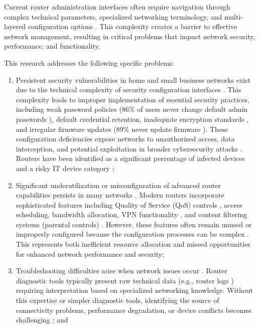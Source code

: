 Current router administration interfaces often require navigation through complex technical parameters, specialized networking terminology, and multi-layered configuration options \cite{home_network_challenges}. This complexity creates a barrier to effective network management, resulting in critical problems that impact network security, performance, and functionality.

This research addresses the following specific problems:

\begin{enumerate}
\item Persistent security vulnerabilities in home and small business networks exist due to the technical complexity of security configuration interfaces \cite{consumer_cybersecurity}. This complexity leads to improper implementation of essential security practices, including weak password policies (86\% of users never change default admin passwords \cite{router_password_study}), default credential retention, inadequate encryption standards \cite{iot_security_challenges}, and irregular firmware updates (89\% never update firmware \cite{router_password_study}). These configuration deficiencies expose networks to unauthorized access, data interception, and potential exploitation in broader cybersecurity attacks \cite{home_wifi_security}. Routers have been identified as a significant percentage of infected devices \cite{router_exploitable} and a risky IT device category \cite{riskiest_devices};

\item Significant underutilization or misconfiguration of advanced router capabilities persists in many networks \cite{parental_controls_value}. Modern routers incorporate sophisticated features including Quality of Service (QoS) controls \cite{tplink_qos}, access scheduling, bandwidth allocation, VPN functionality \cite{vpn_study}, and content filtering systems (parental controls) \cite{parental_controls_value}. However, these features often remain unused or improperly configured because the configuration processes can be complex \cite{router_guide}. This represents both inefficient resource allocation and missed opportunities for enhanced network performance and security;

\item Troubleshooting difficulties arise when network issues occur \cite{diagnostic_issues}. Router diagnostic tools typically present raw technical data (e.g., router logs \cite{router_logs}) requiring interpretation based on specialized networking knowledge. Without this expertise or simpler diagnostic tools, identifying the source of connectivity problems, performance degradation, or device conflicts becomes challenging \cite{diagnostic_issues}; and


\end{enumerate}
